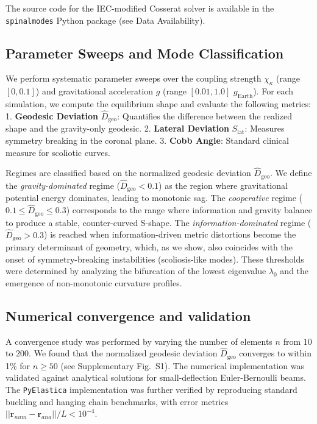 \documentclass[11pt,a4paper]{article}
\begin{document}
The source code for the IEC-modified Cosserat solver is available in the \texttt{spinalmodes} Python package (see Data Availability).

\subsection{Parameter Sweeps and Mode Classification}

We perform systematic parameter sweeps over the coupling strength $\chi_\kappa$ (range $[0, 0.1]$) and gravitational acceleration $g$ (range $[0.01, 1.0]$ $g_{\mathrm{Earth}}$). For each simulation, we compute the equilibrium shape and evaluate the following metrics:
1.  \textbf{Geodesic Deviation} $\widehat{D}_{\mathrm{geo}}$: Quantifies the difference between the realized shape and the gravity-only geodesic.
2.  \textbf{Lateral Deviation} $S_{\mathrm{lat}}$: Measures symmetry breaking in the coronal plane.
3.  \textbf{Cobb Angle}: Standard clinical measure for scoliotic curves.

Regimes are classified based on the normalized geodesic deviation $\widehat{D}_{\mathrm{geo}}$. We define the \emph{gravity-dominated} regime ($\widehat{D}_{\mathrm{geo}} < 0.1$) as the region where gravitational potential energy dominates, leading to monotonic sag. The \emph{cooperative} regime ($0.1 \leq \widehat{D}_{\mathrm{geo}} \leq 0.3$) corresponds to the range where information and gravity balance to produce a stable, counter-curved S-shape. The \emph{information-dominated} regime ($\widehat{D}_{\mathrm{geo}} > 0.3$) is reached when information-driven metric distortions become the primary determinant of geometry, which, as we show, also coincides with the onset of symmetry-breaking instabilities (scoliosis-like modes). These thresholds were determined by analyzing the bifurcation of the lowest eigenvalue $\lambda_0$ and the emergence of non-monotonic curvature profiles.

\subsection{Numerical convergence and validation}

A convergence study was performed by varying the number of elements $n$ from $10$ to $200$. We found that the normalized geodesic deviation $\widehat{D}_{\mathrm{geo}}$ converges to within 1\% for $n \geq 50$ (see Supplementary Fig.~S1). The numerical implementation was validated against analytical solutions for small-deflection Euler-Bernoulli beams. The \texttt{PyElastica} implementation was further verified by reproducing standard buckling and hanging chain benchmarks, with error metrics $||\mathbf{r}_{num} - \mathbf{r}_{ana}||/L < 10^{-4}$.
\end{document}
